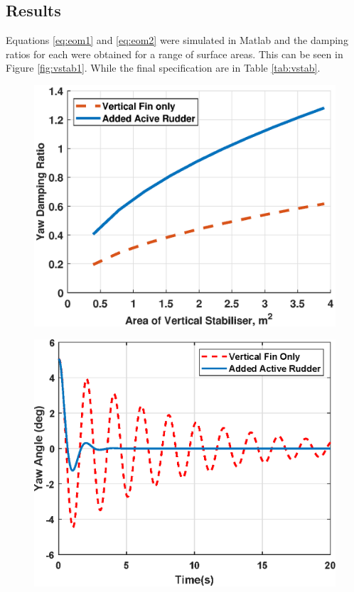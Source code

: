 \documentclass[11pt,a4paper]{article}
\begin{document}
\subsection{Results}
Equations \ref{eq:eom1} and \ref{eq:eom2} were simulated in Matlab and the damping ratios for each were obtained for a range of surface areas. This can be seen in Figure \ref{fig:vstab1}. While the final specification are in Table \ref{tab:vstab}.

\begin{figure}[H]
\centering
\begin{minipage}{.48\textwidth}
  \centering
  \includegraphics[width=\linewidth]{DampVArea3.eps}
  \label{fig:vstab1}
\end{minipage}\hspace{0.2cm}
\begin{minipage}{.48\textwidth}
  \centering
  \includegraphics[width=0.9\linewidth]{Vstabresp2.eps}
  \label{fig:vstab2}
\end{minipage}
\end{figure}
\end{document}
